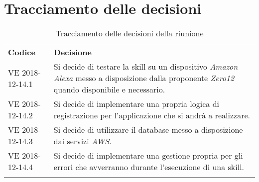 \clearpage
\section{Tracciamento delle decisioni}
\label{sec:tracciamento_decisioni}
\begin{center}
	\renewcommand{\arraystretch}{1.5}
	\begin{longtable}{  p{2.8cm} p{11.4cm} }
		\rowcolor{tableHeadYellow}
		\textbf{Codice}&\textbf{Decisione}\\
		VE 2018-12-14.1 & Si decide di testare la skill su un dispositivo \textit{Amazon Alexa} messo a disposizione dalla proponente \textit{Zero12} quando disponibile e necessario.\\
		VE 2018-12-14.2 & Si decide di implementare una propria logica di registrazione per l'applicazione che si andrà a realizzare.\\
		VE 2018-12-14.3 & Si decide di utilizzare il database messo a disposizione dai servizi \textit{AWS}.\\
		VE 2018-12-14.4 & Si decide di implementare una gestione propria per gli errori che avverranno durante l'esecuzione di una skill.\\
		\rowcolor{white}
		\caption{Tracciamento delle decisioni della riunione}
	\end{longtable}	
\end{center}